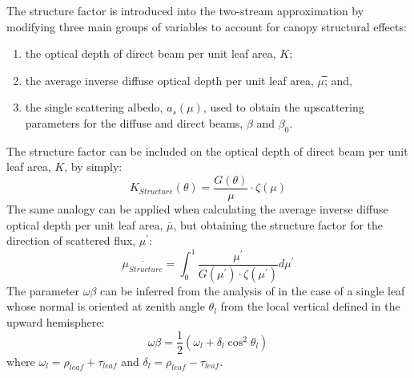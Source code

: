 The structure factor is introduced into the two-stream approximation by modifying three main groups of variables to account for canopy structural effects:
\begin{enumerate}
\item the optical depth of direct beam per unit leaf area, $K$; 
\item the average inverse diffuse optical depth per unit leaf area, $\mu$̅; and, 
\item the single scattering albedo, $a_s(\mu)$, used to obtain the upscattering parameters for the diffuse and direct beams, $\beta$ and $\beta_0$.
\end{enumerate}
The structure factor can be included on the optical depth of direct beam per unit leaf area, $K$, by simply:
\begin{equation}
K_{Structure}(\theta) = \frac{G(\theta)}{\mu} \cdot  \zeta(\mu)
\label{equation:opticaldepthstruct}
\end{equation}
The same analogy can be applied when calculating the average inverse diffuse optical depth per unit leaf area, $\bar{\mu}$, but obtaining the structure factor for the direction of scattered flux, $\mu^\prime$:
\begin{equation}
\overline{\mu_{Structure}} = \int_{0}^{1} \frac{\mu^\prime}{G(\mu^\prime) \cdot \zeta(\mu^\prime)} d\mu^\prime
\label{equation:muprimestruct}
\end{equation}
The parameter $\omega\beta$ can be inferred from the analysis of \citet{Norman1975} in the case of a single leaf whose normal is oriented at zenith angle $\theta_l$ from the local vertical defined in the upward hemisphere:
\begin{equation}
\omega\beta = \frac{1}{2}(\omega_l + \delta_l \cos^2 \theta_l)
\label{equation:omegabeta}
\end{equation}
\noindent where $\omega_l = \rho_{leaf} + \tau_{leaf}$ and $\delta_l = \rho_{leaf} - \tau_{leaf}$. 


